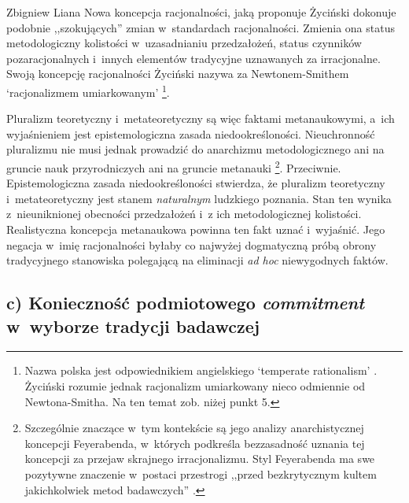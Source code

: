 \begin{artplenv}{Zbigniew Liana}
Nowa koncepcja racjonalności, jaką proponuje Życiński dokonuje podobnie ,,szokujących'' zmian w~standardach racjonalności. Zmienia ona status metodologiczny kolistości w~uzasadnianiu przedzałożeń, status czynników pozaracjonalnych i~innych elementów tradycyjne uznawanych za irracjonalne. Swoją koncepcję racjonalności Życiński nazywa za Newtonem-Smithem ‘racjonalizmem umiarkowanym'
\parencite[][s.~205]{zycinski_teizm_1985}%
\footnote{Nazwa polska jest odpowiednikiem angielskiego ‘temperate rationalism' 
\parencite[][s.~266–273]{newton-smith_rationality_1981}. %
 Życiński rozumie jednak racjonalizm umiarkowany nieco odmiennie od Newtona-Smitha. Na ten temat zob. niżej punkt 5.}.

Pluralizm teoretyczny i~metateoretyczny są więc faktami metanaukowymi, a~ich wyjaśnieniem jest epistemologiczna zasada niedookreśloności. Nieuchronność pluralizmu nie musi jednak prowadzić do anarchizmu metodologicznego ani na gruncie nauk przyrodniczych ani na gruncie metanauki
\parencites[zob. np.][s.~183nn]{zycinski_jezyk_1983}[][s.~161n.203nn]{zycinski_teizm_1985}%
\footnote{Szczególnie znaczące w~tym kontekście są jego analizy anarchistycznej koncepcji Feyerabenda, w~których podkreśla bezzasadność uznania tej koncepcji za przejaw skrajnego irracjonalizmu. Styl Feyerabenda ma swe pozytywne znaczenie w~postaci przestrogi ,,przed bezkrytycznym kultem jakichkolwiek metod badawczych'' 
\parencites[zob.][s.~217–227, zwł. s.~220]{zycinski_elementy_1996}[][s.~295–308, zwł. s.~299n]{zycinski_elementy_2015}.%
}. Przeciwnie. Epistemologiczna zasada niedookreśloności stwierdza, że pluralizm teoretyczny i~metateoretyczny jest stanem \textit{naturalnym} ludzkiego poznania. Stan ten wynika z~nieuniknionej obecności przedzałożeń i~z ich metodologicznej kolistości. Realistyczna koncepcja metanaukowa powinna ten fakt uznać i~wyjaśnić. Jego negacja w~imię racjonalności byłaby co najwyżej dogmatyczną próbą obrony tradycyjnego stanowiska polegającą na eliminacji \textit{ad hoc} niewygodnych faktów.

\subsection{c) Konieczność podmiotowego \textit{commitment} w~wyborze tradycji badawczej}


\end{artplenv}
